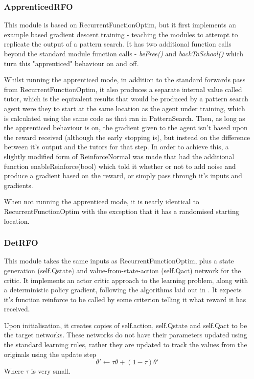 \subsubsection{ApprenticedRFO}
This module is based on RecurrentFunctionOptim, but it first implements an example based gradient descent training - teaching the modules to attempt to replicate the output of a pattern search. It has two additional function calls beyond the standard module function calls - \emph{beFree()} and \emph{backToSchool()} which turn this "apprenticed" behaviour on and off.

Whilst running the apprenticed mode, in addition to the standard forwards pass from RecurrentFunctionOptim, it also produces a separate internal value called tutor, which is the equivalent results that would be produced by a pattern search agent were they to start at the same location as the agent under training, which is calculated using the same code as that ran in PatternSearch. Then, as long as the apprenticed behaviour is on, the gradient given to the agent isn't based upon the reward received (although the early stopping is), but instead on the difference between it's output and the tutors for that step. In order to achieve this, a slightly modified form of ReinforceNormal was made that had the additional function enableReinforce(bool) which told it whether or not to add noise and produce a gradient based on the reward, or simply pass through it's inputs and gradients.

When not running the apprenticed mode, it is nearly identical to RecurrentFunctionOptim with the exception that it has a randomised starting location.

\subsubsection{DetRFO}
This module takes the same inputs as RecurrentFunctionOptim, plus a state generation (self.Qstate) and value-from-state-action (self.Qact) network for the critic. It implements an actor critic approach to the learning problem, along with a deterministic policy gradient, following the algorithms laid out in \cite{lillicrap2015continuous}. It expects it's function reinforce to be called by some criterion telling it what reward it has received.

Upon initialisation, it creates copies of self.action, self.Qstate and self.Qact to be the target networks. These networks do not have their parameters updated using the standard learning rules, rather they are updated to track the values from the originals using the update step \begin{equation}
\theta' \gets \tau \theta + (1 - \tau)\theta'
\end{equation} Where $\tau$ is very small.

